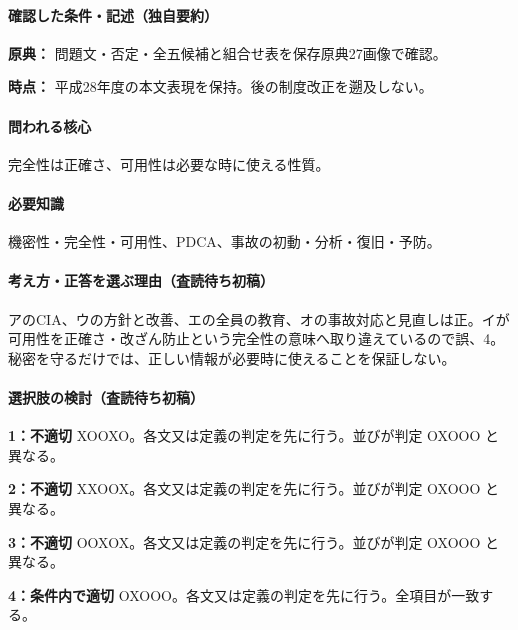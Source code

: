 \paragraph{確認した条件・記述（独自要約）}\mbox{}\par

\noindent\textbf{原典：} 問題文・否定・全五候補と組合せ表を保存原典27画像で確認。\par

\noindent\textbf{時点：} 平成28年度の本文表現を保持。後の制度改正を遡及しない。\par

\paragraph{問われる核心} 完全性は正確さ、可用性は必要な時に使える性質。

\paragraph{必要知識} 機密性・完全性・可用性、PDCA、事故の初動・分析・復旧・予防。

\paragraph{考え方・正答を選ぶ理由（査読待ち初稿）} アのCIA、ウの方針と改善、エの全員の教育、オの事故対応と見直しは正。イが可用性を正確さ・改ざん防止という完全性の意味へ取り違えているので誤、4。秘密を守るだけでは、正しい情報が必要時に使えることを保証しない。

\paragraph{選択肢の検討（査読待ち初稿）}\mbox{}\par

\noindent\textbf{1：不適切} XOOXO。各文又は定義の判定を先に行う。並びが判定 OXOOO と異なる。\par

\noindent\textbf{2：不適切} XXOOX。各文又は定義の判定を先に行う。並びが判定 OXOOO と異なる。\par

\noindent\textbf{3：不適切} OOXOX。各文又は定義の判定を先に行う。並びが判定 OXOOO と異なる。\par

\noindent\textbf{4：条件内で適切} OXOOO。各文又は定義の判定を先に行う。全項目が一致する。\par

